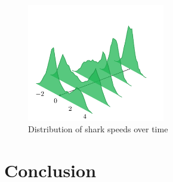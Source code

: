 \documentclass[letterpaper]{article}
\begin{document}
\begin{figure}[t]
\begin{center}
\includegraphics[width=6cm]{figures/shark_speeds.png}
\caption{Distribution of shark speeds over time}
\label{fig:shark_speeds}
\end{center}
\end{figure}

\blindtext[8]

\section{Conclusion}

\blindtext[2]

\footnotesize

\end{document}
